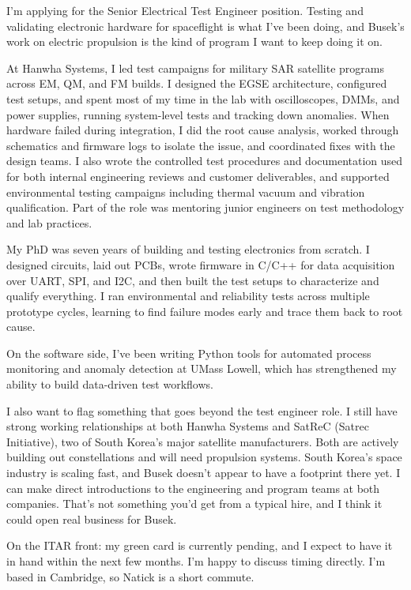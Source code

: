 \documentclass[letterpaper,11pt]{moderncv}
\date{\today}
\begin{document}
\makelettertitle

I'm applying for the Senior Electrical Test Engineer position. Testing and validating electronic hardware for spaceflight is what I've been doing, and Busek's work on electric propulsion is the kind of program I want to keep doing it on.

At Hanwha Systems, I led test campaigns for military SAR satellite programs across EM, QM, and FM builds. I designed the EGSE architecture, configured test setups, and spent most of my time in the lab with oscilloscopes, DMMs, and power supplies, running system-level tests and tracking down anomalies. When hardware failed during integration, I did the root cause analysis, worked through schematics and firmware logs to isolate the issue, and coordinated fixes with the design teams. I also wrote the controlled test procedures and documentation used for both internal engineering reviews and customer deliverables, and supported environmental testing campaigns including thermal vacuum and vibration qualification. Part of the role was mentoring junior engineers on test methodology and lab practices.

My PhD was seven years of building and testing electronics from scratch. I designed circuits, laid out PCBs, wrote firmware in C/C++ for data acquisition over UART, SPI, and I2C, and then built the test setups to characterize and qualify everything. I ran environmental and reliability tests across multiple prototype cycles, learning to find failure modes early and trace them back to root cause.

On the software side, I've been writing Python tools for automated process monitoring and anomaly detection at UMass Lowell, which has strengthened my ability to build data-driven test workflows.

I also want to flag something that goes beyond the test engineer role. I still have strong working relationships at both Hanwha Systems and SatReC (Satrec Initiative), two of South Korea's major satellite manufacturers. Both are actively building out constellations and will need propulsion systems. South Korea's space industry is scaling fast, and Busek doesn't appear to have a footprint there yet. I can make direct introductions to the engineering and program teams at both companies. That's not something you'd get from a typical hire, and I think it could open real business for Busek.

On the ITAR front: my green card is currently pending, and I expect to have it in hand within the next few months. I'm happy to discuss timing directly. I'm based in Cambridge, so Natick is a short commute.
\end{document}
